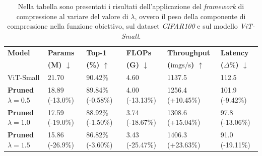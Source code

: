 \begin{table}[H]
    \centering
    \footnotesize
    \setlength{\tabcolsep}{4pt}
    \begin{tabular}{@{} l l l l l l @{}}
        \toprule
        \textbf{Model} & \textbf{Params} & \textbf{Top-1} & \textbf{FLOPs} & \textbf{Throughput} & \textbf{Latency} \\ 
                       & \textbf{(M) $\downarrow$}    & \textbf{(\%) $\uparrow$}  & \textbf{(G) $\downarrow$}   & \textbf{($\text{imgs}/\text{s}$) $\uparrow$} & \textbf{($\Delta\%$) $\downarrow$} \\ 
        \midrule
        ViT-Small                           & 21.70 \hphantom{(-00.0\%)}                 & 90.42\% \hphantom{(-0.00\%)}                 & 4.60 \hphantom{(-00.00\%)}          & 1137.5 \hphantom{(+00.00\%)}            & 112.5 \hphantom{(-00.00\%)}          \\
        \midrule
        \textbf{Pruned $\lambda=0.5$} & 18.89 (-13.0\%)                            & 89.84\% (-0.58\%)                            & 4.00 (-13.13\%)                     & 1256.4 (+10.45\%)                       & 101.9 (-9.42\%)                      \\
        \midrule
        \textbf{Pruned $\lambda=1.0$} & 17.59 (-19.0\%)                            & 88.92\% (-1.50\%)                            & 3.74 (-18.67\%)                     & 1308.6 (+15.04\%)                       & 97.8 (-13.06\%)                      \\
        \midrule
        \textbf{Pruned $\lambda=1.5$} & 15.86 (-26.9\%)                            & 86.82\% (-3.60\%)                            & 3.43 (-25.47\%)                     & 1406.3 (+23.63\%)                       & 91.0 (-19.11\%)                      \\
        \bottomrule
    \end{tabular}
    \vspace{10pt}
    \caption{Nella tabella sono presentati i risultati dell'applicazione del \textit{framework} di compressione al variare del valore di $\lambda$, ovvero il peso della componente di compressione nella funzione obiettivo, sul dataset \textit{CIFAR100} e sul modello \textit{ViT-Small}.}
    \label{tab:risultati-lambda}
\end{table}

